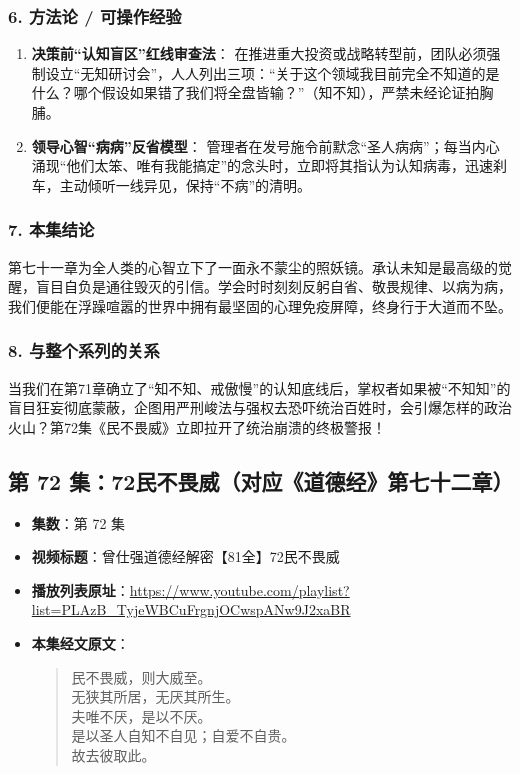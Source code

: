 \subsubsection{6. 方法论 / 可操作经验}
\begin{enumerate}
    \item \textbf{决策前“认知盲区”红线审查法}：
    在推进重大投资或战略转型前，团队必须强制设立“无知研讨会”，人人列出三项：“关于这个领域我目前完全不知道的是什么？哪个假设如果错了我们将全盘皆输？”（知不知），严禁未经论证拍胸脯。
    \item \textbf{领导心智“病病”反省模型}：
    管理者在发号施令前默念“圣人病病”；每当内心涌现“他们太笨、唯有我能搞定”的念头时，立即将其指认为认知病毒，迅速刹车，主动倾听一线异见，保持“不病”的清明。
\end{enumerate}

\subsubsection{7. 本集结论}
第七十一章为全人类的心智立下了一面永不蒙尘的照妖镜。承认未知是最高级的觉醒，盲目自负是通往毁灭的引信。学会时时刻刻反躬自省、敬畏规律、以病为病，我们便能在浮躁喧嚣的世界中拥有最坚固的心理免疫屏障，终身行于大道而不坠。

\subsubsection{8. 与整个系列的关系}
当我们在第71章确立了“知不知、戒傲慢”的认知底线后，掌权者如果被“不知知”的盲目狂妄彻底蒙蔽，企图用严刑峻法与强权去恐吓统治百姓时，会引爆怎样的政治火山？第72集《民不畏威》立即拉开了统治崩溃的终极警报！

\clearpage

\subsection{第 72 集：72民不畏威（对应《道德经》第七十二章）}
\label{sec:ep72}

\begin{itemize}
    \item \textbf{集数}：第 72 集
    \item \textbf{视频标题}：曾仕强道德经解密【81全】72民不畏威
    \item \textbf{播放列表原址}：\url{https://www.youtube.com/playlist?list=PLAzB_TyjeWBCuFrgnjOCwspANw9J2xaBR}
    \item \textbf{本集经文原文}：
    \begin{quote}\kaishu
    民不畏威，则大威至。\\
    无狭其所居，无厌其所生。\\
    夫唯不厌，是以不厌。\\
    是以圣人自知不自见；自爱不自贵。\\
    故去彼取此。
    \end{quote}
\end{itemize}

